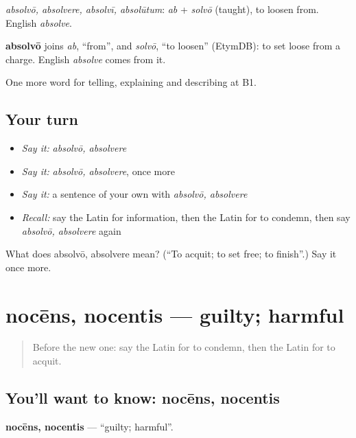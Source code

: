 \emph{absolvō, absolvere, absolvī, absolūtum}: \emph{ab} + \emph{solvō} (taught), to loosen from. English \emph{absolve}.

\begin{cousinweb}
\textbf{absolvō} joins \emph{ab}, \textquotedblleft{}from\textquotedblright{}, and \emph{solvō}, \textquotedblleft{}to loosen\textquotedblright{} (EtymDB): to set loose from a charge. English \emph{absolve} comes from it.
\end{cousinweb}

\begin{grammarlens}[title={What you've built}]
One more word for telling, explaining and describing at B1.
\end{grammarlens}

\subsection*{Your turn}
\begin{itemize}
\raggedright
  \item \emph{Say it:} \emph{absolvō, absolvere}
  \item \emph{Say it:} \emph{absolvō, absolvere}, once more
  \item \emph{Say it:} a sentence of your own with \emph{absolvō, absolvere}
  \item \emph{Recall:} say the Latin for information, then the Latin for to condemn, then say \emph{absolvō, absolvere} again
\end{itemize}

\begin{tcolorbox}[breakable,colback=teal!4,colframe=teal!35!black,title={Before you move on}]
What does absolvō, absolvere mean? (\textquotedblleft{}To acquit; to set free; to finish\textquotedblright{}.) Say it once more.
\end{tcolorbox}
\section[nocēns, nocentis]{nocēns, nocentis — guilty; harmful}

\label{lesson:LA-C311-nocens}



\begin{quote}
Before the new one: say the Latin for to condemn, then the Latin for to acquit.
\end{quote}

\subsection*{You'll want to know: nocēns, nocentis}
\textbf{nocēns, nocentis} — \textquotedblleft{}guilty; harmful\textquotedblright{}.

